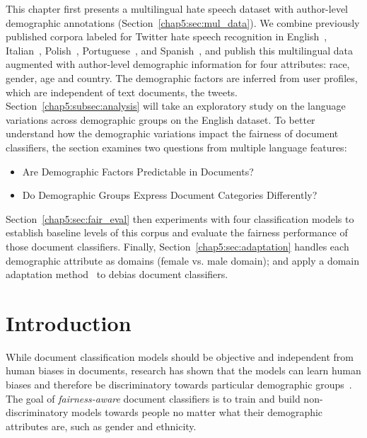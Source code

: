 This chapter first presents a multilingual hate speech dataset with author-level demographic annotations (Section~\ref{chap5:sec:mul_data}). 
We combine previously published corpora labeled for Twitter hate speech recognition in English~\cite{waseem2016hateful,waseem2016you,founta2018large}, Italian~\cite{sanguinetti2018italian}, Polish~\cite{ptaszynski2017learning}, Portuguese~\cite{fortuna2019hierarchically}, and Spanish~\cite{basile2019semeval}, and publish this multilingual data augmented with author-level demographic information for four attributes: race, gender, age and country.
The demographic factors are inferred from user profiles, which are independent of text documents, the tweets.
Section~\ref{chap5:subsec:analysis} will take an exploratory study on the language variations across demographic groups on the English dataset.
To better understand how the demographic variations impact the fairness of document classifiers, the section examines two questions from multiple language features:
\begin{itemize}
    \item Are Demographic Factors Predictable in Documents?
    \item Do Demographic Groups Express Document Categories Differently?
\end{itemize}
Section~\ref{chap5:sec:fair_eval} then experiments with four classification models to establish baseline levels of this corpus and evaluate the fairness performance of those document classifiers.
Finally, Section~\ref{chap5:sec:adaptation} handles each demographic attribute as domains (female vs. male domain); and apply a domain adaptation method~\cite{daume2007frustratingly} to debias document classifiers.



\section{Introduction}

While document classification models should be objective and independent from human biases in documents, research has shown that the models can learn human biases and therefore be discriminatory towards particular demographic groups~\cite{dixon2018measuring, borkan2019nuanced, sun2019mitigating}.
The goal of \textit{fairness-aware} document classifiers is to train and build non-discriminatory models towards people no matter what their demographic attributes are, such as gender and ethnicity.

